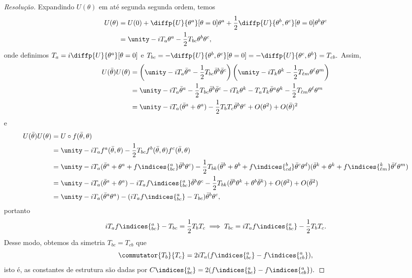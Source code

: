 \begin{proof}[Resolução]
    Expandindo \(U(\theta)\) em até segunda segunda ordem, temos
    \begin{align*}
       U(\theta) &= U(0) + \diffp{U}{\theta^a}[\theta = 0] \theta^a + \frac12 \diffp{U}{\theta^b,\theta^c}[\theta = 0] \theta^b\theta^c\\
                 &= \unity - i T_a \theta^a - \frac12 T_{bc} \theta^b \theta^c,
    \end{align*}
    onde definimos \(T_a = i \diffp{U}{\theta^a}[\theta = 0]\) e \(T_{bc} = - \diffp{U}{\theta^b,\theta^c}[\theta=0] = - \diffp{U}{\theta^c,\theta^b} = T_{cb}.\) Assim,
    \begin{align*}
       U(\bar{\theta}) U(\theta) &= \left(\unity - i T_a \bar{\theta}^a - \frac12 T_{bc} \bar{\theta}^b \bar{\theta}^c\right)\left(\unity - i T_k \theta^k - \frac12 T_{\ell m} \theta^\ell \theta^m\right)\\
                                 &= \unity -i T_a \bar{\theta}^a - \frac12 T_{bc} \bar{\theta}^b \bar{\theta}^c -i T_k \theta^k - T_a T_k \bar{\theta}^a \theta^k - \frac12 T_{\ell m} \theta^\ell \theta^m\\
                                 &= \unity - i T_a (\bar{\theta}^a + \theta^a) - \frac12 T_b T_c \bar{\theta}^b \theta^c + O(\theta^2) + O(\bar{\theta})^2
    \end{align*}
    e
    \begin{align*}
       U(\bar{\theta}) U(\theta) &= U \circ f(\bar{\theta},\theta)\\
                                 &= \unity - i T_a f^a(\bar{\theta}, \theta) -\frac12 T_{bc} f^{b}(\bar{\theta}, \theta) f^{c}(\bar{\theta},\theta)\\
                                 &= \unity - iT_a (\bar{\theta}^a + \theta^a + f\indices{^a_{bc}} \bar{\theta}^b \theta^c) - \frac12 T_{bk} (\bar{\theta}^b + \theta^b + f\indices{^b_{cd}} \bar{\theta}^c \theta^d)(\bar{\theta}^k + \theta^k + f\indices{^k_{\ell m}} \bar{\theta}^\ell \theta^m)\\
                                 &= \unity - i T_a(\bar{\theta}^a + \theta^a) -i T_a f\indices{^a_{bc}} \bar{\theta}^b \theta^c - \frac12 T_{bk} (\bar{\theta}^b \theta^k + \theta^b \bar{\theta}^k) + O(\theta^2) + O(\bar{\theta}^2)\\
                                 &= \unity - iT_a(\bar{\theta}^a \theta^a) - (iT_a f\indices{^a_{bc}} - T_{bc})\bar{\theta}^b \theta^c,
    \end{align*}
    portanto
    \begin{equation*}
       iT_a f\indices{^a_{bc}} - T_{bc} = \frac12 T_b T_c \implies T_{bc} = i T_a f\indices{^a_{bc}} - \frac12 T_b T_c.
    \end{equation*}
    Desse modo, obtemos da simetria \(T_{bc} = T_{cb}\) que
    \begin{equation*}
       \commutator{T_b}{T_c} = 2i T_a (f\indices{^a_{bc}} - f\indices{^a_{cb}}),
    \end{equation*}
    isto é, as constantes de estrutura são dadas por \(C\indices{^a_{bc}} = 2 (f\indices{^a_{bc}} - f\indices{^a_{cb}}).\)
\end{proof}
